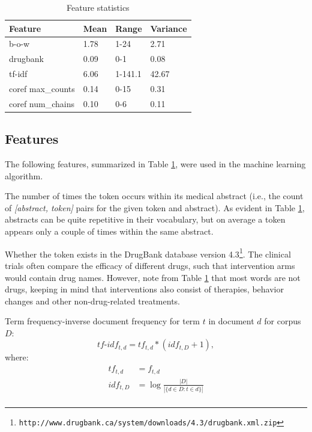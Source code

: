 \begin{table}[h]
  \begin{tabular}{l|l|l|l}
      \hline
      Feature & Mean & Range & Variance \\\hline\hline
      b-o-w & 1.78 & 1-24 & 2.71\\
      drugbank & 0.09 & 0-1 & 0.08\\
      tf-idf & 6.06 & 1-141.1 & 42.67\\
      coref max\_counts & 0.14 & 0-15 & 0.31\\
      coref num\_chains & 0.10 & 0-6 & 0.11\\\hline
  \end{tabular}
  \caption{Feature statistics}
  \label{tab:4}
\end{table}

\subsection{Features}
\label{subsec:features}
The following features, summarized in Table \ref{tab:4}, were used in the machine learning algorithm.

 The number of times the token occurs within its medical abstract (i.e., the count of \textit{[abstract, token]} pairs for the given token and abstract). As evident in Table \ref{tab:4}, abstracts can be quite repetitive in their vocabulary, but on average a token appears only a couple of times within the same abstract.

\vspace{.25em}

 Whether the token exists in the DrugBank database version 4.3\footnote{\scriptsize {\tt http://www.drugbank.ca/system/downloads/4.3/drugbank.xml.zip}}. The clinical trials often compare the efficacy of different drugs, such that intervention arms would contain drug names. However, note from Table \ref{tab:4} that most words are not drugs, keeping in mind that interventions also consist of therapies, behavior changes and other non-drug-related treatments.

\vspace{.25em}
 Term frequency-inverse document frequency for term $t$ in document $d$ for corpus $D$:
\vspace{-.5em}
\begin{equation}\label{tfidf}
tf\text{-}idf_{t,d} = tf_{t,d} * (idf_{t,D} + 1),
\end{equation}
where:
\vspace{-1.5em}
\begin{equation*}
\begin{aligned}
tf_{t,d}& =f_{t, d}\\
idf_{t, D}& =  \log \frac{|D|}{|\{d \in D: t \in d\}|}\\
\end{aligned}
\end{equation*}

